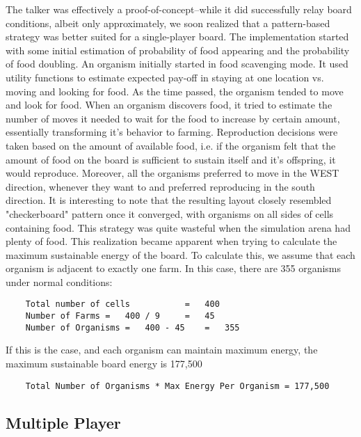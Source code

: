 The talker was effectively a proof-of-concept--while it did successfully relay board conditions, albeit only approximately, we soon realized that a pattern-based strategy was better suited for a single-player board. The implementation started
with some initial estimation of probability of food appearing and the probability of food doubling. An organism initially
started in food scavenging mode. It used utility functions to estimate expected pay-off in staying at one location vs. 
moving and looking for food. As the time passed, the organism tended to move and look for food. When an organism discovers
food, it tried to estimate the number of moves it needed to wait for the food to increase by certain amount, essentially 
transforming it's behavior to farming. Reproduction decisions were taken based on the amount of available food, i.e. if 
the organism felt that the amount of food on the board is sufficient to sustain itself and it's offspring, it would reproduce.
Moreover, all the organisms preferred to move in the WEST direction, whenever they want to and preferred reproducing in the 
south direction.  It is interesting to note that the resulting layout closely resembled "checkerboard" pattern once it 
converged, with organisms on all sides of cells containing food. This strategy was quite wasteful when the simulation 
arena had plenty of food.  This realization became apparent when trying to calculate the maximum sustainable energy of 
the board. To calculate this, we assume that each organism is adjacent to exactly one farm.  In this case, there are 355 
organisms under normal conditions:
\begin{verbatim}
	Total number of cells			=	400
	Number of Farms	=	400 / 9 	= 	45
	Number of Organisms = 	400 - 45	= 	355
\end{verbatim}

If this is the case, and each organism can maintain maximum energy, the maximum sustainable board energy is 177,500
\begin{verbatim}
	Total Number of Organisms * Max Energy Per Organism = 177,500
\end{verbatim}





\subsection{Multiple Player}

